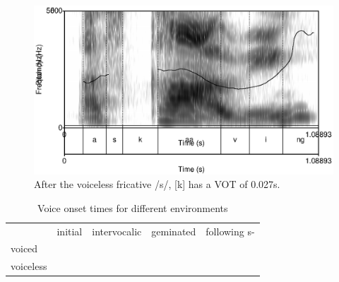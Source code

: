 \begin{figure}
 \centering
 \includegraphics[height=0.3\textheight]{./pics/askaaving.eps}

 \caption{After the voiceless fricative /s/, [k] has a VOT of 0.027s.}
 \label{fig:phon:vot:askaaving}
\end{figure}


\begin{table}
\begin{center}
\begin{tabular}{lllll}
 & initial & intervocalic & geminated & following s- \\
voiced &  &  &  &  \\ 
voiceless &  &  &  & 
\end{tabular}
\end{center}
\caption{Voice onset times for different environments}
\label{tab:phon:VOT}
\end{table}
